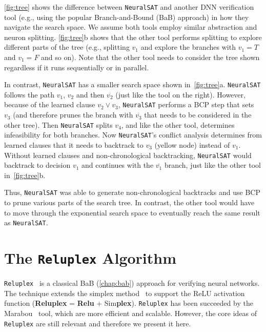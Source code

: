\documentclass[oneside,11pt,dvipsnames]{book}
\numberwithin{equation}{section}
\theoremstyle{definition}
\theoremstyle{remark}
\newcommand{\tvn}[1]{\iftoggle{usecomment}{{\color{red}{[TVN]: #1}}}{}}
\newcommand{\hd}[1]{\iftoggle{usecomment}{{\color{blue}{[HD]: #1}}}{}}
\newcommand{\reluplex}{\texttt{Reluplex}}
\newcommand{\tool}{\texttt{NeuralSAT}}
\begin{document}

\autoref{fig:tree} shows the difference between \tool{} and another DNN verification tool (e.g., using the popular Branch-and-Bound (BaB) approach) in how they navigate the search space.  We assume both tools employ similar abstraction and neuron splitting.
\autoref{fig:tree}b shows that the other tool performs splitting to explore different parts of the tree (e.g., splitting $v_1$ and explore the branches with $v_1=T$ and $v_1=F$ and so on). Note that the other tool needs to consider the tree shown regardless if it runs sequentially or in parallel.

In contrast, \tool{} has a smaller search space shown in~\autoref{fig:tree}a.
\tool{} follows the path $v_1$, $v_2$ and then $\overline{v_2}$ (just like the tool on the right).
However, because of the learned clause $v_2\lor v_3$, \tool{} performs a BCP step that sets $v_3$ (and therefore prunes the branch with $\overline{v_3}$ that needs to be considered in the other tree).
Then \tool{} splits $v_4$, and like the other tool, determines infeasibility for both branches. Now \tool{}'s conflict analysis determines from learned clauses that it needs to backtrack to $v_3$ (yellow node) instead of $v_1$.  Without learned clauses and non-chronological backtracking, \tool{} would backtrack to decision $v_1$ and continues with the $\overline{v_1}$ branch, just like the other tool in~\autoref{fig:tree}b.

Thus, \tool{} was able to generate non-chronological backtracks and use BCP to prune various parts of the search tree.  In contrast, the other tool would have to move through the exponential search space to eventually reach the same result as \tool{}.




\chapter{The \reluplex{} Algorithm}\label{chap:reluplex}

\reluplex{}~\cite{katz2017reluplex} is a classical BaB (\autoref{chap:bab}) approach for verifying neural networks. The technique extends the simplex method~\cite{nelder1965simplex} to support the ReLU activation function (\textbf{Reluplex} = \textbf{Relu} + Sim\textbf{plex}). \reluplex{} has been succeeded by the Marabou~\cite{katz2019marabou} tool, which are more efficient and scalable. However, the core ideas of \reluplex{} are still relevant and therefore we present it here.
\end{document}
